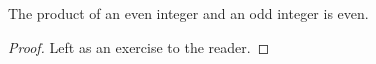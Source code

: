 \guard




\begin{prop}
\label{prop:productOfEvenAndOddIsEven}
  The product of an even integer and an odd integer is even.
\end{prop}
\begin{proof}
  Left as an exercise to the reader.
\end{proof}
